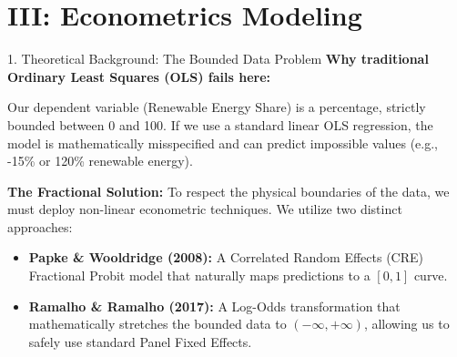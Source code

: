 \documentclass[aspectratio=169]{beamer}
\begin{document}
\section{III: Econometrics Modeling}

\begin{frame}{1. Theoretical Background: The Bounded Data Problem}
  \textbf{Why traditional Ordinary Least Squares (OLS) fails here:}
  \vspace{0.2cm}
  
  Our dependent variable (Renewable Energy Share) is a percentage, strictly bounded between 0 and 100. If we use a standard linear OLS regression, the model is mathematically misspecified and can predict impossible values (e.g., -15\% or 120\% renewable energy). 
  
  \vspace{0.3cm}
  \textbf{The Fractional Solution:}
  To respect the physical boundaries of the data, we must deploy non-linear econometric techniques. We utilize two distinct approaches:
  \begin{itemize}
      \item \textbf{Papke \& Wooldridge (2008):} A Correlated Random Effects (CRE) Fractional Probit model that naturally maps predictions to a $[0, 1]$ curve.
      \item \textbf{Ramalho \& Ramalho (2017):} A Log-Odds transformation that mathematically stretches the bounded data to $(-\infty, +\infty)$, allowing us to safely use standard Panel Fixed Effects.
  \end{itemize}
\end{frame}
\end{document}
